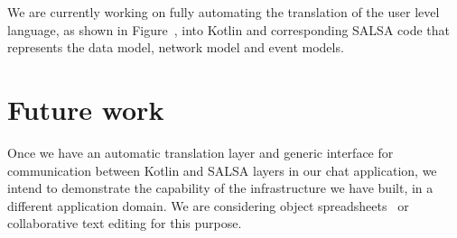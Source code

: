 \documentclass[a4paper]{article}
\begin{document}
We are currently working on fully automating the translation of the user level language, as shown in Figure~, into Kotlin and corresponding SALSA code that represents the data model, network model and event models.

\section{Future work}
Once we have an automatic translation layer and generic interface for communication between Kotlin and SALSA layers in our chat application, we intend to demonstrate the capability of the infrastructure we have built, in a different application domain. We are considering object spreadsheets~\cite{McCutchen:2016:OSN:2986012.2986018} or collaborative text editing for this purpose.  








\end{document}
